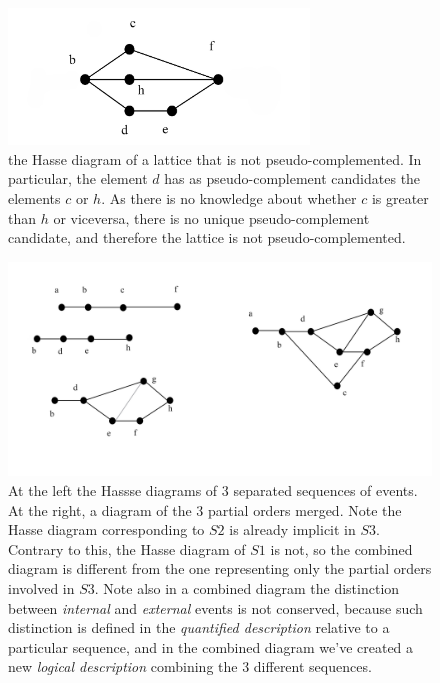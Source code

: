 \documentclass[
		twoside,openright,titlepage,numbers=noenddot,manychapters,
		headinclude,%
                footinclude=false,cleardoublepage=empty,
                BCOR=5mm,
		fontsize=11pt, %
                 enabledeprecatedfontcommands]{scrreprt}
\begin{document}
\begin{figure}[]
\begin{center}
\includegraphics[width=8cm]{figures/diamond_hasse.jpg}
\caption{the Hasse diagram of a lattice that is not pseudo-complemented. In particular, the element $d$ has as pseudo-complement candidates the elements $c$ or $h$. As there is no knowledge about whether $c$ is greater than $h$ or viceversa, there is no unique pseudo-complement candidate, and therefore the lattice is not pseudo-complemented. }
\label{fig_diamond_hasse}
\end{center}
\end{figure}



\begin{figure}[]
\begin{center}
\includegraphics[width=12cm]{figures/3in1_hasse.jpg}
\caption{ At the left the Hassse diagrams of 3 separated sequences of events. At the right, a diagram of the 3 partial orders merged. Note the Hasse diagram corresponding to $S2$ is already implicit in $S3$. Contrary to this, the Hasse diagram of $S1$ is not, so the combined diagram is different from the one representing only the partial orders involved in $S3$. Note also in a combined diagram the distinction between \emph{internal} and \emph{external} events is not conserved, because such distinction is defined in the \emph{quantified description} relative to a particular sequence, and in the combined diagram we've created a new \emph{logical description} combining the 3 different sequences.}
\label{fig_3in1_hasse}

\end{center}

\end{figure}
\end{document}
